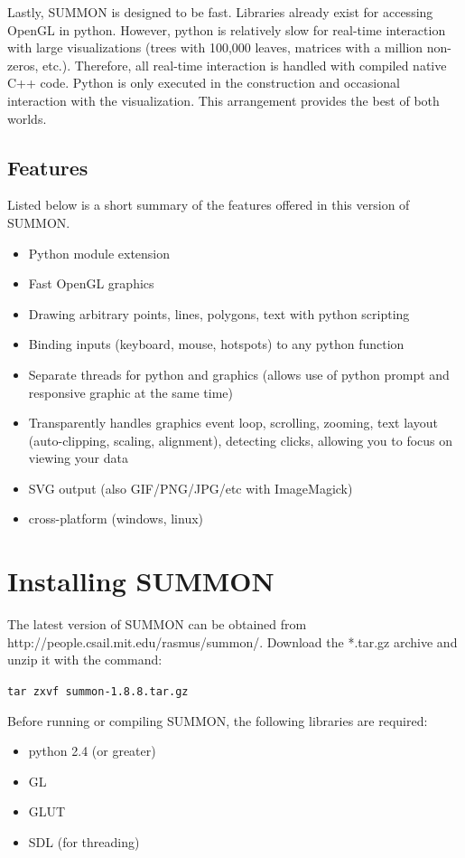 \documentclass[12pt]{article}
\newcommand{\items}[1]{\begin{itemize} #1 \end{itemize}}
\newcommand{\codeblock}[1]{\vspace{.1in} {\tt #1} \vspace{.1in}}
\newcommand{\version}{1.8.8}
\begin{document}
Lastly, SUMMON is designed to be fast.  Libraries already exist for
accessing OpenGL in python.  However, python is relatively slow for real-time
interaction with large visualizations (trees with 100,000 leaves, matrices with
a million non-zeros, etc.).  Therefore, all real-time interaction is handled
with compiled native C++ code.  Python is only executed in the construction 
and occasional interaction with the visualization.  This arrangement provides 
the best of both worlds.




\subsection{Features}

Listed below is a short summary of the features offered in this version of
SUMMON.

\items{
    \item Python module extension
    \item Fast OpenGL graphics
    \item Drawing arbitrary points, lines, polygons, text with python scripting
    \item Binding inputs (keyboard, mouse, hotspots) to any python function 
    \item Separate threads for python and graphics (allows use of python prompt
          and responsive graphic at the same time)    
    \item Transparently handles graphics event loop, scrolling, zooming, text
          layout (auto-clipping, scaling, alignment), detecting clicks, allowing
          you to focus on viewing your data
    \item SVG output (also GIF/PNG/JPG/etc with ImageMagick)
    \item cross-platform (windows, linux)
}


\section{Installing SUMMON}
\label{sec:installing}

The latest version of SUMMON can be obtained from 
http://people.csail.mit.edu/rasmus/summon/.  Download the *.tar.gz archive and
unzip it with the command:

\codeblock{tar zxvf summon-\version.tar.gz}

Before running or compiling SUMMON, the following libraries are required:
\items {
    \item python 2.4 (or greater)
    \item GL   
    \item GLUT
    \item SDL (for threading)
}
\end{document}
